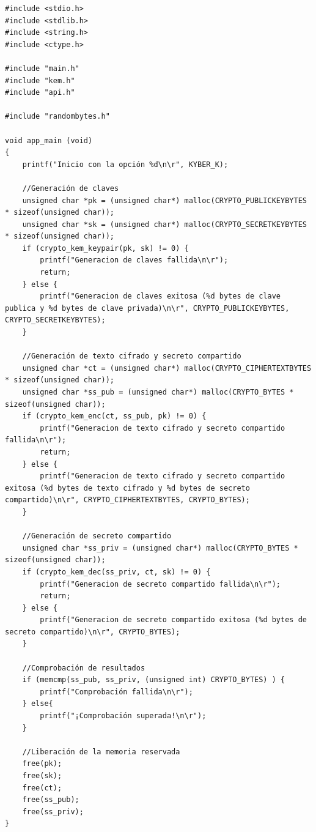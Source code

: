 \begin{lstlisting}[label={lst:kyber-main},style=Cnice,firstnumber=1,caption={Archivo \texttt{Kyber/main/main.c}.}]
#include <stdio.h>
#include <stdlib.h>
#include <string.h>
#include <ctype.h>

#include "main.h"
#include "kem.h"
#include "api.h"

#include "randombytes.h"

void app_main (void)
{
    printf("Inicio con la opción %d\n\r", KYBER_K);

    //Generación de claves
    unsigned char *pk = (unsigned char*) malloc(CRYPTO_PUBLICKEYBYTES * sizeof(unsigned char));
    unsigned char *sk = (unsigned char*) malloc(CRYPTO_SECRETKEYBYTES * sizeof(unsigned char));
    if (crypto_kem_keypair(pk, sk) != 0) {
        printf("Generacion de claves fallida\n\r");
        return;
    } else {
        printf("Generacion de claves exitosa (%d bytes de clave publica y %d bytes de clave privada)\n\r", CRYPTO_PUBLICKEYBYTES, CRYPTO_SECRETKEYBYTES);
    }

    //Generación de texto cifrado y secreto compartido
    unsigned char *ct = (unsigned char*) malloc(CRYPTO_CIPHERTEXTBYTES * sizeof(unsigned char));
    unsigned char *ss_pub = (unsigned char*) malloc(CRYPTO_BYTES * sizeof(unsigned char));
    if (crypto_kem_enc(ct, ss_pub, pk) != 0) {
        printf("Generacion de texto cifrado y secreto compartido fallida\n\r");
        return;
    } else {
        printf("Generacion de texto cifrado y secreto compartido exitosa (%d bytes de texto cifrado y %d bytes de secreto compartido)\n\r", CRYPTO_CIPHERTEXTBYTES, CRYPTO_BYTES);
    }

    //Generación de secreto compartido
    unsigned char *ss_priv = (unsigned char*) malloc(CRYPTO_BYTES * sizeof(unsigned char));
    if (crypto_kem_dec(ss_priv, ct, sk) != 0) {
        printf("Generacion de secreto compartido fallida\n\r");
        return;
    } else {
        printf("Generacion de secreto compartido exitosa (%d bytes de secreto compartido)\n\r", CRYPTO_BYTES);
    }

    //Comprobación de resultados
    if (memcmp(ss_pub, ss_priv, (unsigned int) CRYPTO_BYTES) ) {
        printf("Comprobación fallida\n\r");
    } else{
        printf("¡Comprobación superada!\n\r");
    }

    //Liberación de la memoria reservada
    free(pk);
    free(sk);
    free(ct);
    free(ss_pub);
    free(ss_priv);
}
\end{lstlisting}

